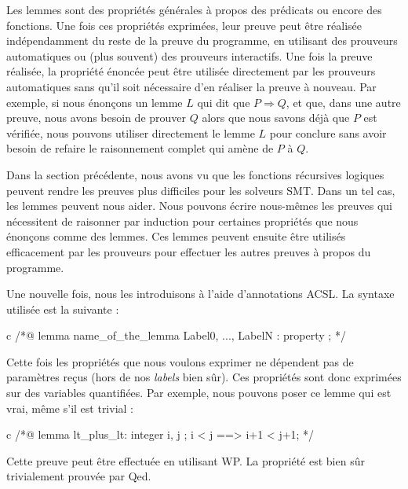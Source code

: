 
Les lemmes sont des propriétés générales à propos des prédicats ou encore des
fonctions. Une fois ces propriétés exprimées, leur preuve peut être réalisée
indépendamment du reste de la preuve du programme, en utilisant des prouveurs
automatiques ou (plus souvent) des prouveurs interactifs. Une fois la preuve
réalisée, la propriété énoncée peut être utilisée directement par les prouveurs
automatiques sans qu'il soit nécessaire d'en réaliser la preuve à nouveau. Par
exemple, si nous énonçons un lemme $L$ qui dit que $P \Rightarrow Q$, et que,
dans une autre preuve, nous avons besoin de prouver $Q$ alors que nous savons
déjà que $P$ est vérifiée, nous pouvons utiliser directement le lemme $L$ pour
conclure sans avoir besoin de refaire le raisonnement complet qui amène de $P$
à $Q$.



Dans la section précédente, nous avons vu que les fonctions récursives logiques
peuvent rendre les preuves plus difficiles pour les solveurs SMT. Dans un tel cas,
les lemmes peuvent nous aider. Nous pouvons écrire nous-mêmes les preuves qui
nécessitent de raisonner par induction pour certaines propriétés que nous
énonçons comme des lemmes. Ces lemmes peuvent ensuite être utilisés
efficacement par les prouveurs pour effectuer les autres preuves à propos du
programme.




Une nouvelle fois, nous les introduisons à l'aide d'annotations ACSL. La syntaxe
utilisée est la suivante :



\begin{CodeBlock}{c}
/*@
  lemma name_of_the_lemma { Label0, ..., LabelN }:
    property ;
*/
\end{CodeBlock}



Cette fois les propriétés que nous voulons exprimer ne dépendent pas de
paramètres reçus (hors de nos \textit{labels} bien sûr). Ces propriétés sont donc
exprimées sur des variables quantifiées. Par exemple, nous pouvons poser ce
lemme qui est vrai, même s'il est trivial :



\begin{CodeBlock}{c}
/*@
  lemma lt_plus_lt:
    \forall integer i, j ; i < j ==> i+1 < j+1;
*/
\end{CodeBlock}



Cette preuve peut être effectuée en utilisant WP. La propriété est bien sûr
trivialement prouvée par Qed.



